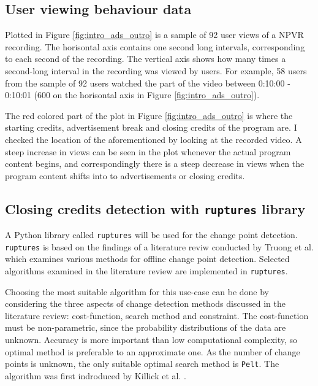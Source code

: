 \subsection{User viewing behaviour data} \label{subsec:data}
Plotted in Figure \ref{fig:intro_ads_outro} is a sample of 92 user views of a NPVR recording. The horisontal axis contains one second long intervals, corresponding to each second of the recording. The vertical axis shows how many times a second-long interval in the recording was viewed by users. For example, 58 users from the sample of 92 users watched the part of the video between 0:10:00 - 0:10:01 (600 on the horisontal axis in Figure \ref{fig:intro_ads_outro}).

The red colored part of the plot in Figure \ref{fig:intro_ads_outro} is where the starting credits, advertisement break and closing credits of the program are. I checked the location of the aforementioned by looking at the recorded video. A steep increase in views can be seen in the plot whenever the actual program content begins, and correspondingly there is a steep decrease in views when the program content shifts into to advertisements or closing credits.

\subsection{Closing credits detection with \texttt{ruptures} library} \label{subsec:solution}

A Python library called \texttt{ruptures} will be used for the change point detection. \texttt{ruptures} is based on the findings of a literature reviw conducted by Truong et al. \cite{truongSelectiveReviewOffline2020} which examines various methods for offline change point detection. Selected algorithms examined in the literature review are implemented in \texttt{ruptures}.

Choosing the most suitable algorithm %
for this use-case can be done by considering the three aspects of change detection methods discussed in the literature review: cost-function, search method and constraint. The cost-function must be non-parametric, since the probability distributions of the data are unknown. Accuracy is more important than low computational complexity, so optimal method is preferable to an approximate one. As the number of change points is unknown, the only suitable optimal search method is \texttt{Pelt}. The algorithm was first indroduced by Killick et al. \cite{killickOptimalDetectionChangepoints2012}.

